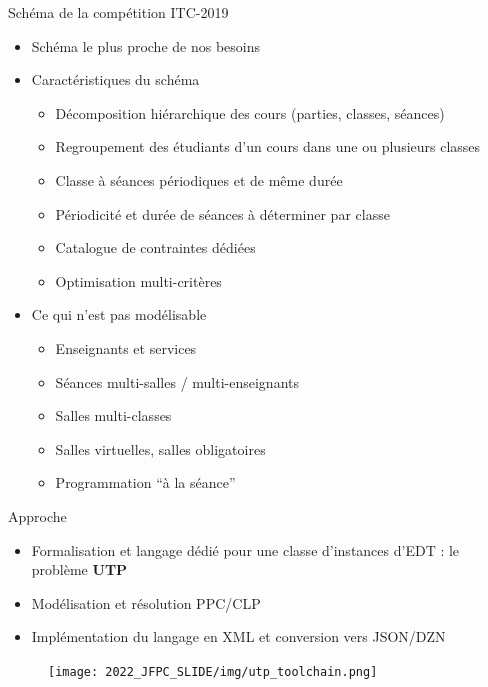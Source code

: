 \documentclass{beamer}
\begin{document}
\begin{frame}{Schéma de la compétition ITC-2019 \cite{2018_muller_PATAT}}

    \begin{itemize}
        \item Schéma le plus proche de nos besoins
        \item Caractéristiques du schéma 
        \begin{itemize}
            \item Décomposition hiérarchique des cours (parties, classes, séances)
            \item Regroupement des étudiants d'un cours dans une ou plusieurs classes 
            \item Classe à séances périodiques et de même durée
            \item Périodicité et durée de séances à déterminer par classe
            \item Catalogue de contraintes dédiées
            \item Optimisation multi-critères
        \end{itemize}
    \end{itemize}

    \begin{itemize}
        \item Ce qui n'est pas modélisable 
            \begin{itemize}
                \item Enseignants et services
                \item Séances multi-salles / multi-enseignants
                \item Salles multi-classes
                \item Salles virtuelles, salles obligatoires
                \item Programmation ``à la séance''
            \end{itemize}
    \end{itemize}
\end{frame}
\begin{frame}{Approche}
\begin{itemize}
    \item Formalisation et langage dédié pour une classe d'instances d'EDT : le problème \textbf{UTP}
    \item Modélisation et résolution PPC/CLP
    \item Implémentation du langage en XML et conversion vers JSON/DZN
\end{itemize}
    \begin{figure}
        \centering
        \texttt{[image: 2022\_JFPC\_SLIDE/img/utp\_toolchain.png]}
    \end{figure}
\end{frame}
\end{document}

